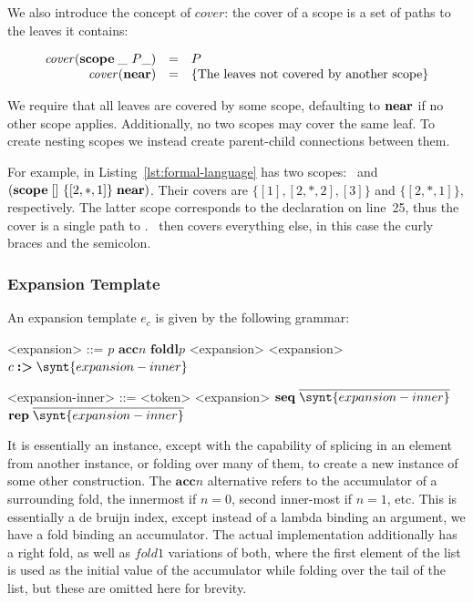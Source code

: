 \documentclass{kththesis}
\begin{document}
\newcommand{\cover}{\ensuremath{\mathit{cover}}}
We also introduce the concept of \cover: the cover of a scope is a set of paths to the leaves it contains:

$$
\begin{array}{rcl}
\cover(\scope \_\ P \_) & = & P \\
\cover(\near) & = & \{\text{The leaves not covered by another scope}\} \\
\end{array}
$$

We require that all leaves are covered by some scope, defaulting to $\mathrel{\mathbf{near}}$ if no other scope applies. Additionally, no two scopes may cover the same leaf. To create nesting scopes we instead create parent-child connections between them.

For example,  in Listing~\ref{lst:formal-language} has two scopes: \near\ and $(\mathrel{\mathbf{scope}} []\ \{[2, *, 1]\} \mathrel{\mathbf{near}})$. Their covers are $\{[1], [2, *, 2], [3]\}$ and $\{[2, *, 1]\}$, respectively. The latter scope corresponds to the  declaration on line~25, thus the cover is a single path to . \near\ then covers everything else, in this case the curly braces and the semicolon.

\subsubsection{Expansion Template}

An expansion template $e_c$ is given by the following grammar:

\newcommand{\acc}{\mathrel{\mathbf{acc}}}
\newcommand{\foldl}{\mathrel{\mathbf{foldl}}}

\setlength{\grammarindent}{12em}
\begin{grammar}
<expansion> ::= $p$
  \alt $\acc n$
  \alt $\foldl p$ <expansion> <expansion>
  \alt $c \tagged \synt{expansion-inner}$

<expansion-inner> ::= <token>
  \alt <expansion>
  \alt $\seq \overline{\synt{expansion-inner}}$
  \alt $\repseq \overline{\synt{expansion-inner}}$
\end{grammar}

It is essentially an instance, except with the capability of splicing in an element from another instance, or folding over many of them, to create a new instance of some other construction. The $\acc n$ alternative refers to the accumulator of a surrounding fold, the innermost if $n = 0$, second inner-most if $n = 1$, etc. This is essentially a de bruijn index, except instead of a lambda binding an argument, we have a fold binding an accumulator. The actual implementation additionally has a right fold, as well as $\mathit{fold1}$ variations of both, where the first element of the list is used as the initial value of the accumulator while folding over the tail of the list, but these are omitted here for brevity.
\end{document}
